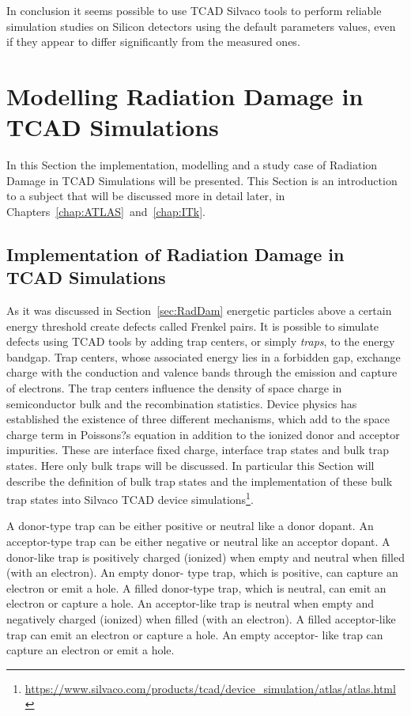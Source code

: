 In conclusion it seems possible to use TCAD Silvaco tools to perform reliable simulation studies 
on Silicon detectors using the default parameters values, even if they appear to differ significantly 
from the measured ones. 


\section{Modelling Radiation Damage in TCAD Simulations}
\label{sec:TCADRadDamage}

In this Section the implementation, modelling and a  study case of Radiation Damage in TCAD 
Simulations will be presented. This Section is an introduction to a subject that will be 
discussed more in detail later, in Chapters~\ref{chap:ATLAS}~and~\ref{chap:ITk}.

\subsection{Implementation of Radiation Damage in TCAD Simulations}
As it was discussed in Section~\ref{sec:RadDam} energetic particles above a certain energy threshold 
create defects called Frenkel pairs. 
It is possible to simulate defects using TCAD tools by adding trap centers, or simply {\it traps}, to the 
energy bandgap. 
Trap centers, whose associated energy lies in a forbidden gap, exchange charge with the conduction 
and valence bands through the emission and capture of electrons. The trap centers influence the 
density of space charge in semiconductor bulk and the recombination statistics.
Device physics has established the existence of three different mechanisms, which add to the space 
charge term in Poissons?s equation in addition to the ionized donor and acceptor impurities. These are 
interface fixed charge, interface trap states and bulk trap states. Here only bulk traps 
will be discussed. In particular this Section will describe the definition of bulk trap states and the implementation of these bulk trap states into Silvaco TCAD device simulations\footnote{\url{https://www.silvaco.com/products/tcad/device_simulation/atlas/atlas.html}}.

A donor-type trap can be either positive or neutral like a donor dopant. An acceptor-type trap can be 
either negative or neutral like an acceptor dopant. A donor-like trap is positively charged (ionized) when 
empty and neutral when filled (with an electron). An empty donor- type trap, which is positive, can 
capture an electron or emit a hole. A filled donor-type trap, which is neutral, can emit an electron or 
capture a hole. An acceptor-like trap is neutral when empty and negatively charged (ionized) when filled 
(with an electron). A filled acceptor-like trap can emit an electron or capture a hole. An empty acceptor-
like trap can capture an electron or emit a hole. 

